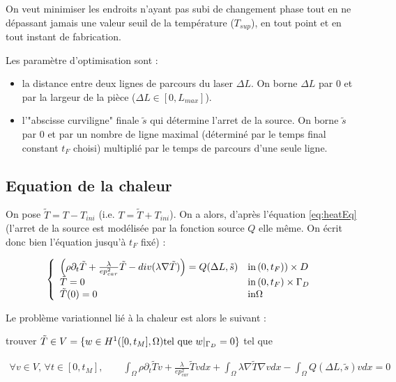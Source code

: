 \documentclass[11pt,a4paper]{article}
\begin{document}
On veut minimiser les endroits n'ayant pas subi de changement phase tout en ne dépassant jamais une valeur seuil de la température ($T_{sup}$), en tout point et en tout instant de fabrication.

Les paramètre d'optimisation sont :
\begin{itemize}
	\item la distance entre deux lignes de parcours du laser $\Delta L$. On borne $\Delta L$ par 0 et par la largeur de la pièce ($\Delta L\in[0,L_{max}]$).
	\item l'"abscisse curviligne" finale $\tilde{s}$ qui détermine l'arret de la source. On borne $\tilde{s}$ par 0 et par un nombre de ligne maximal (déterminé par le temps final constant $t_F$ choisi) multiplié par le temps de parcours d'une seule ligne. 
\end{itemize}
 
\subsection*{Equation de la chaleur}

On pose $\tilde{T}=T-T_{ini}$ (i.e. $T=\tilde{T}+T_{ini}$). On a alors, d'après l'équation \ref{eq:heatEq} (l'arret de la source est modélisée par la fonction source $Q$ elle même. On écrit donc bien l'équation jusqu'à $t_F$ fixé) :

\begin{equation}
\label{eq:ChaleurTilde}
\left\{\begin{array}{ll}
\Big(\rho\partial_t \tilde{T}+\frac{\lambda}{ep_{car}^2} \tilde{T}-div(\lambda\nabla \tilde{T})\Big)=Q(\Delta L,\tilde{s})& \textrm{in\,}(0,t_F))\times D \\
\tilde{T}=0 & \textrm{in\,}(0,t_F)\times \Gamma_D \\
\tilde{T}(0)=0 & \textrm{in} \Omega
\end{array}\right.
\end{equation}




Le problème variationnel lié à la chaleur est alors le suivant :

trouver $\tilde{T}\in V=\{w\in H^1([0,t_M],\Omega) \textrm{tel\,\,que} \,\,w|_{\Gamma_D}=0\}$ tel que

\begin{equation}
\label{eq:pbVarChaleurTF}
\begin{aligned}
\forall v\in V,\,\forall t\in[0,t_M], \qquad\int_{\Omega}\rho\partial_t \tilde{T}v+\frac{\lambda}{ep_{car}^2} \tilde{T}v dx+\int_{\Omega}\lambda\nabla \tilde{T}\nabla vdx-\int_{\Omega}Q(\Delta L,\tilde{s})vdx=0
\end{aligned} 
\end{equation}
\end{document}

